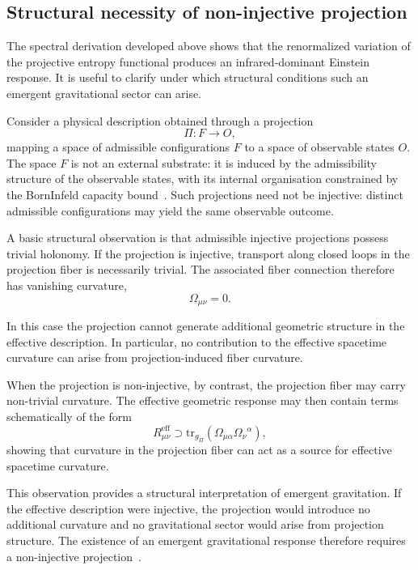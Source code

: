 \subsection{Structural necessity of non-injective projection}
  \label{subsec:structural-necessity}

  The spectral derivation developed above shows that the renormalized variation
  of the projective entropy functional produces an infrared-dominant Einstein
  response.
  It is useful to clarify under which structural conditions such an emergent
  gravitational sector can arise.

  Consider a physical description obtained through a projection
  \[
    \Pi : F \rightarrow O ,
  \]
  mapping a space of admissible configurations $F$ to a space of observable
  states $O$.
  The space $F$ is not an external substrate: it is induced by the admissibility
  structure of the observable states, with its internal organisation constrained
  by the Born\textendash Infeld capacity bound~\cite{Beau2026Foundation,Beau2026l}.
  Such projections need not be injective: distinct admissible configurations may
  yield the same observable outcome.

  A basic structural observation is that admissible injective projections possess
  trivial holonomy.
  If the projection is injective, transport along closed loops in the projection
  fiber is necessarily trivial.
  The associated fiber connection therefore has vanishing curvature,
  \[
    \Omega_{\mu\nu} = 0 .
  \]

  In this case the projection cannot generate additional geometric structure in
  the effective description.
  In particular, no contribution to the effective spacetime curvature can arise
  from projection-induced fiber curvature.

  When the projection is non-injective, by contrast, the projection fiber may
  carry non-trivial curvature.
  The effective geometric response may then contain terms schematically of the
  form
  \[
    R^{\mathrm{eff}}_{\mu\nu}
    \supset
    \mathrm{tr}_{g_\Pi}\!\left(\Omega_{\mu\alpha}\Omega_\nu{}^{\alpha}\right),
  \]
  showing that curvature in the projection fiber can act as a source for
  effective spacetime curvature.

  This observation provides a structural interpretation of emergent gravitation.
  If the effective description were injective, the projection would introduce no
  additional curvature and no gravitational sector would arise from projection
  structure.
  The existence of an emergent gravitational response therefore requires a
  non-injective projection~\cite{Beau2026l}.


